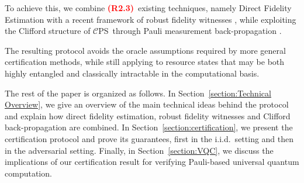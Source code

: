 \documentclass[a4paper,twocolumn,11pt,unpublished]{quantumarticle}
\newcommand{\CEPS}{$\mathcal C$PS}
\newif\ifhighlightchanges \highlightchangestrue
\newcommand{\revother}[1]{\ifhighlightchanges{\color{red}#1}\else#1\fi}
\newcommand{\revtag}[1]{\ifhighlightchanges\textcolor{red}{\textbf{(#1)}}\ \fi}
\newcommand{\rev}[2]{\revother{\revtag{#1}#2}}
\begin{document}
To achieve this, we combine \rev{R2.3}{existing techniques, namely} Direct Fidelity Estimation \cite{FL11direct, FOS24optimal} with a recent framework of robust fidelity witnesses \cite{CGKM21efficient}, while exploiting the Clifford structure of \CEPS~through Pauli measurement back-propagation \cite{UC24efficient}. 

The resulting protocol avoids the oracle assumptions required by more general certification methods, while still applying to resource states that may be both highly entangled and classically intractable in the computational basis.

The rest of the paper is organized as follows. In Section~\ref{section:Technical Overview}, we give an overview of the main technical ideas behind the protocol and explain how direct fidelity estimation, robust fidelity witnesses and Clifford back-propagation are combined. In Section~\ref{section:certification}, we present the certification protocol and prove its guarantees, first in the i.i.d.\ setting and then in the adversarial setting. Finally, in Section~\ref{section:VQC}, we discuss the implications of our certification result for verifying Pauli-based universal quantum computation.
\end{document}
